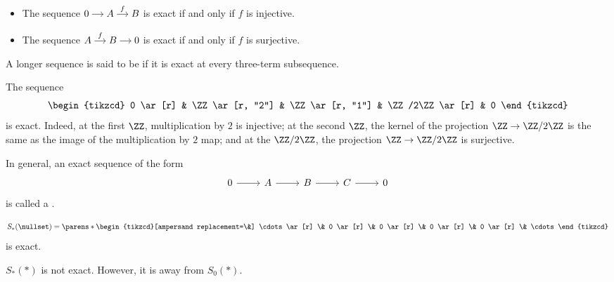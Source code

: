 \documentclass{standalone}
\begin{document}
\begin{example}
  \begin{itemize}[nosep]
    \item The sequence
      \(
        \begin{tikzcd}[cramped, sep=small]
          0 \ar[r] &
          A \ar[r, "f"] &
          B
        \end{tikzcd}
      \)
      is exact if and only if \(f\) is injective.
    \item The sequence
      \(
        \begin{tikzcd}[cramped, sep=small]
          A \ar[r, "f"] &
          B \ar[r] &
          0
        \end{tikzcd}
      \)
      is exact if and only if \(f\) is surjective.
  \end{itemize}
\end{example}

\begin{definition}
  A longer sequence is said to be  if it is exact at every
  three-term subsequence.
\end{definition}

\begin{example}
  The sequence
  \[
    \begin{tikzcd}
    	0 \ar[r] &
    	\ZZ \ar[r, "2"] &
    	\ZZ \ar[r, "1"] &
    	\ZZ/2\ZZ \ar[r] &
    	0
    \end{tikzcd}
  \]
  is exact. Indeed, at the first \(\ZZ\), multiplication by \(2\) is injective;
  at the second \(\ZZ\), the kernel of the projection \(\ZZ \to \ZZ/2\ZZ\) is
  the same as the image of the multiplication by \(2\) map; and at
  the \(\ZZ/2\ZZ\), the projection \(\ZZ \to \ZZ/2\ZZ\) is surjective.

  In general, an exact sequence of the form
  \[
    \begin{tikzcd}
    	0 \ar[r] &
    	A \ar[r] &
    	B \ar[r] &
    	C \ar[r] &
    	0
    \end{tikzcd}
  \]
  is called a .
\end{example}

\begin{example}
  \[
    S_*(\nullset) = \parens*{
      \begin{tikzcd}[ampersand replacement=\&]
        \cdots \ar[r] \&
        0 \ar[r] \&
        0 \ar[r] \&
        0 \ar[r] \&
        0 \ar[r] \&
        \cdots
      \end{tikzcd}
    }
  \]
  is exact.

  \(S_*(*)\) is not exact. However, it is away from \(S_0(*)\).
\end{example}
\end{document}
